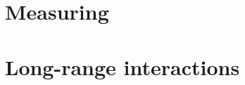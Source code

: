 \documentclass[a4paper,12pt,openany,hidelinks]{book}
\begin{document}


\chapter{Measuring}



\chapter{Long-range interactions}



\begin{comment}

\chapter{Hydrodynamics}

BDHI

SPH and DPD

PSE

\chapter{Advanced topics}

Neighbour lists

\end{comment}
\end{document}
